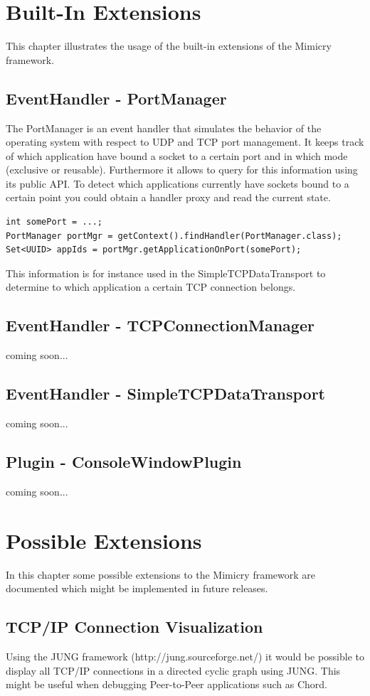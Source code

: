 \documentclass[a4paper,oneside]{book}
\begin{document}
\chapter{Built-In Extensions}
This chapter illustrates the usage of the built-in extensions of the Mimicry framework.

\section{EventHandler - PortManager}
The PortManager is an event handler that simulates the behavior of the operating system with respect to UDP and TCP port management. It keeps track of which application have bound a socket to a certain port and in which mode (exclusive or reusable). Furthermore it allows to query for this information using its public API. To detect which applications currently have sockets bound to a certain point you could obtain a handler proxy and read the current state.
\begin{lstlisting}
int somePort = ...;
PortManager portMgr = getContext().findHandler(PortManager.class);
Set<UUID> appIds = portMgr.getApplicationOnPort(somePort);
\end{lstlisting}
This information is for instance used in the SimpleTCPDataTransport to determine to which application a certain TCP connection belongs.

\section{EventHandler - TCPConnectionManager}
coming soon...

\section{EventHandler - SimpleTCPDataTransport}
coming soon...

\section{Plugin - ConsoleWindowPlugin}
coming soon...

\chapter{Possible Extensions}
In this chapter some possible extensions to the Mimicry framework are documented which might be implemented in future releases.

\section{TCP/IP Connection Visualization}
Using the JUNG framework (http://jung.sourceforge.net/) it would be possible to display all TCP/IP connections in a directed cyclic graph using JUNG. This might be useful when debugging Peer-to-Peer applications such as Chord.
\end{document}
